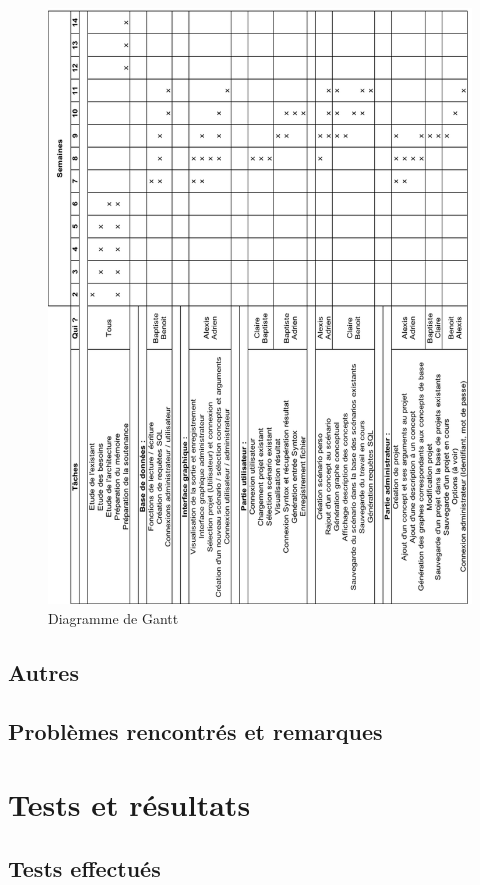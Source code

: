 \documentclass[12pt]{report}
\begin{document}
\begin{figure}
\centering
\includegraphics[scale=1]{GANTT.png}
\caption{Diagramme de Gantt}
\end{figure}

\section{Autres}

\section{Problèmes rencontrés et remarques}

\chapter{Tests et résultats}

\section{Tests effectués}
\end{document}
